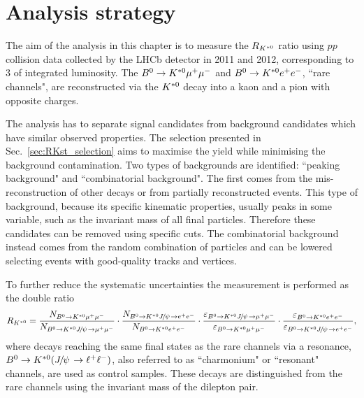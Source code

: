 \begin{center}
\begin{table}[h!]
\centering
\caption{Experimental status of the $R_{K^{(*)}}$ measurements. } %
\label{tab:expstatus}
\end{table}
\end{center}


\section{Analysis strategy}

The aim of the analysis in this chapter is to measure the $R_{{{K}^{*0}}}$ ratio using $pp$ collision data
collected by the LHCb detector in 2011 and 2012, corresponding to 3 \invfb of integrated luminosity.
The ${{B}^0} \rightarrow {\ensuremath{{K}^{*0}}}{\ensuremath{\mu^+\mu^-}}$ and ${{B}^0} \rightarrow {\ensuremath{{K}^{*0}}}{\ensuremath{e^+e^-}}$, ``rare channels", are
reconstructed via the ${{K}^{*0}}$ decay into a kaon and a pion with opposite charges.

The analysis has to separate signal candidates from background candidates which have similar observed properties. 
The selection presented in Sec.~\ref{sec:RKst_selection} aims to maximise the yield while minimising
the background contamination. Two types of backgrounds are identified: ``peaking background" and ``combinatorial background". 
The first comes from the mis-reconstruction of other decays or from partially reconstructed events. This type 
of background,  because its specific kinematic properties, usually peaks in some variable, such as the invariant
mass of all final particles. Therefore these candidates can be removed using specific cuts. 
The combinatorial background  instead comes from the random combination of particles and can 
be lowered selecting events with good-quality tracks and vertices.

To further reduce the systematic uncertainties the measurement is performed as the double ratio 
%
\begin{equation}
\label{eq:RKst}
R_{\Kstarz} = 
\frac{N_{\Bz\to\Kstarz \mumu}}{N_{\Bz\to\Kstarz\jpsi\to \mumu}} 
\cdot \frac{N_{\Bz\to\Kstarz \jpsi \to \ee}}{N_{\Bz\to\Kstarz\ee}}
\cdot \frac{\varepsilon_{\Bz\to\Kstarz \jpsi \to \mumu}}{\varepsilon_{\Bz\to\Kstarz \mumu}} 
\cdot \frac{\varepsilon_{\Bz\to\Kstarz \ee}}{\varepsilon_{\Bz\to\Kstarz\jpsi\to \ee}},
\end{equation}
%
where decays reaching the same final states as the rare channels via a \jpsi resonance, $\Bz\to\Kstarz(\jpsi\to\ll)$,
also referred to as ``charmonium" or ``resonant" channels, are used as control samples.
These decays are distinguished from the rare channels using the invariant mass of the dilepton pair.

